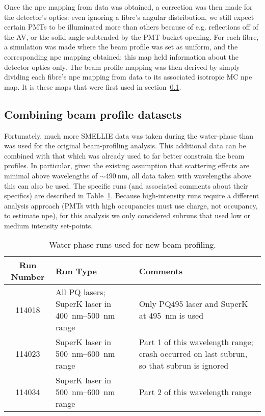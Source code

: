 Once the npe mapping from data was obtained, a correction was then made for the detector's optics: even ignoring a fibre's angular distribution, we still expect certain PMTs to be illuminated more than others because of e.g. reflections off of the AV, or the solid angle subtended by the PMT bucket opening. For each fibre, a simulation was made where the beam profile was set as uniform, and the corresponding npe mapping obtained: this map held information about the detector optics only. The beam profile mapping was then derived by simply dividing each fibre's npe mapping from data to its associated isotropic MC npe map. It is these maps that were first used in section~\ref{}.

\subsection{Combining beam profile datasets}
Fortunately, much more SMELLIE data was taken during the water-phase than was used for the original beam-profiling analysis. This additional data can be combined with that which was already used to far better constrain the beam profiles. In particular, given the existing assumption that scattering effects are minimal above wavelengths of $\sim\SI{490}{\nano\metre}$, all data taken with wavelengths above this can also be used. The specific runs (and associated comments about their specifics) are described in Table~\ref{tab:runs_used}. Because high-intensity runs require a different analysis approach (PMTs with high occupancies must use charge, not occupancy, to  estimate npe), for this analysis we only considered subruns that used low or medium intensity set-points.
\begin{center}
    \begin{table}
        \begin{tabular}{c p{6cm} p{6cm}}
            \hline
            Run Number & Run Type & Comments \\ \hline \hline
            \num{114018} & All PQ lasers; SuperK laser in \SIrange{400}{500}{\nano\metre} range & Only PQ495 laser and SuperK at \SI{495}{\nano\metre} is used \\
            \num{114023} & SuperK laser in \SIrange{500}{600}{\nano\metre} range & Part 1 of this wavelength range; crash occurred on last subrun, so that subrun is ignored \\
            \num{114034} & SuperK laser in \SIrange{500}{600}{\nano\metre} range & Part 2 of this wavelength range \\
            \hline
        \end{tabular}
        \caption{Water-phase runs used for new beam profiling.}
        \label{tab:runs_used}
    \end{table}
\end{center}
